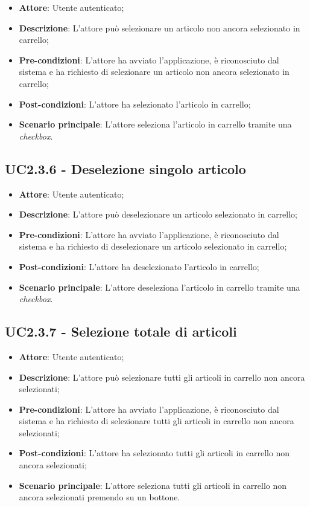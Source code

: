 \begin{itemize}
	\item \textbf{Attore}: Utente autenticato;
	\item \textbf{Descrizione}: L'attore può selezionare un articolo non ancora selezionato in carrello;
	\item \textbf{Pre-condizioni}: L'attore ha avviato l'applicazione, è riconosciuto dal sistema e ha richiesto di selezionare un articolo non ancora selezionato in carrello;
	\item \textbf{Post-condizioni}: L'attore ha selezionato l'articolo in carrello;
	\item \textbf{Scenario principale}: L'attore seleziona l'articolo in carrello tramite una \textit{checkbox}.
\end{itemize}

\subsection{UC2.3.6 - Deselezione singolo articolo}

\begin{itemize}
	\item \textbf{Attore}: Utente autenticato;
	\item \textbf{Descrizione}: L'attore può deselezionare un articolo selezionato in carrello;
	\item \textbf{Pre-condizioni}: L'attore ha avviato l'applicazione, è riconosciuto dal sistema e ha richiesto di deselezionare un articolo selezionato in carrello;
	\item \textbf{Post-condizioni}: L'attore ha deselezionato l'articolo in carrello;
	\item \textbf{Scenario principale}: L'attore deseleziona l'articolo in carrello tramite una \textit{checkbox}.
\end{itemize}

\subsection{UC2.3.7 - Selezione totale di articoli}

\begin{itemize}
	\item \textbf{Attore}: Utente autenticato;
	\item \textbf{Descrizione}: L'attore può selezionare tutti gli articoli in carrello non ancora selezionati;
	\item \textbf{Pre-condizioni}: L'attore ha avviato l'applicazione, è riconosciuto dal sistema e ha richiesto di selezionare tutti gli articoli in carrello non ancora selezionati;
	\item \textbf{Post-condizioni}: L'attore ha selezionato tutti gli articoli in carrello non ancora selezionati;
	\item \textbf{Scenario principale}: L'attore seleziona tutti gli articoli in carrello non ancora selezionati premendo su un bottone.
\end{itemize}

